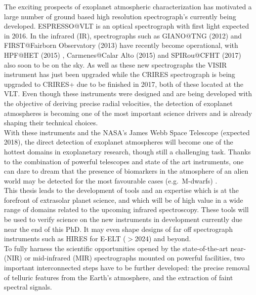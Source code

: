 \documentclass[pdftex,12pt,a4paper]{article}
\begin{document}
The exciting prospects of exoplanet atmospheric characterization has motivated a large number of ground based high resolution spectrograph's currently being developed. ESPRESSO@VLT \citep{Pepe2010} is an optical spectrograph with first light expected in 2016. In the infrared (IR), spectrographs such as GIANO@TNG (2012) and FIRST@Fairborn Observatory (2013) \citep{FIRST2013}  have recently become operational, with HPF@HET (2015) \citep{Mahadevan2012}, Carmenes@Calar Alto (2015) and SPIRou@CFHT (2017) also soon to be on the sky. As well as these new spectrographs the VISIR instrument has just been upgraded while the CRIRES spectrograph is being upgraded to CRIRES+ due to be finished in 2017, both of these located at the VLT. Even though these instruments were designed and are being developed with the objective of deriving precise radial velocities, the detection of exoplanet atmospheres is becoming one of the most important science drivers and is already shaping their technical choices. \\

With these instruments and the NASA's James Webb Space Telescope (expected 2018), the direct detection of exoplanet atmospheres will become one of the hottest domains in exoplanetary research, though still a challenging task. Thanks to the combination of powerful telescopes and state of the art instruments, one can dare to dream that the presence of biomarkers in the atmosphere of an alien world may be detected for the most favourable cases (e.g.\ M-dwarfs) \citep{Palle2011}. \\

This thesis leads to the development of tools and an expertise which is at the forefront of extrasolar planet science, and which will be of high value in a wide range of domains related to the upcoming infrared spectroscopy. These tools will be used to verify science on the new instruments in development currently due near the end of this PhD. It may even shape designs of far off spectrograph instruments such as HIRES for E-ELT ($>$2024) and beyond.\\

To fully harness the scientific opportunities opened by the state-of-the-art near- (NIR) or mid-infrared (MIR) spectrographs mounted on powerful facilities, two important interconnected steps have to be further developed: the precise removal of telluric features from the Earth's atmosphere, and the extraction of faint spectral signals.\\
\end{document}
